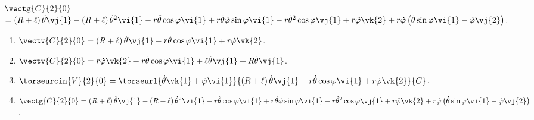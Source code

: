 $\vectg{C}{2}{0}$ 
$ =\left(R+\ell\right)\ddot{\theta}\vj{1} -\left(R+\ell\right)\dot{\theta}^2\vi{1} 
-r\ddot{\theta}\cos\varphi \vi{1} +r\dot{\theta}\dot{\varphi}\sin\varphi \vi{1} -r\dot{\theta}^2\cos\varphi \vj{1} 
+ r\ddot{\varphi}\vk{2}+ r\dot{\varphi}\left(\dot{\theta}\sin\varphi\vi{1}- \dot{\varphi}\vj{2} \right)$.
\else
\fi

\ifcolle
\else
\begin{solution}
\begin{enumerate}
\item $\vectv{C}{2}{0}= \left(R+\ell\right)\dot{\theta}\vj{1} -r\dot{\theta}\cos\varphi \vi{1} + r\dot{\varphi}\vk{2}$.
\item  $\vectv{C}{2}{0}=r\dot{\varphi}\vk{2}-r\dot{\theta}\cos\varphi\vi{1}+\ell\dot{\theta}\vj{1}+R\dot{\theta}\vj{1}$.
\item $\torseurcin{V}{2}{0} = \torseurl{\dot{\theta}\vk{1}+ \dot{\varphi}\vi{1}}{\left(R+\ell\right)\dot{\theta}\vj{1} -r\dot{\theta}\cos\varphi \vi{1} + r\dot{\varphi}\vk{2}}{C}$.
\item $\vectg{C}{2}{0} =\left(R+\ell\right)\ddot{\theta}\vj{1} -\left(R+\ell\right)\dot{\theta}^2\vi{1} 
-r\ddot{\theta}\cos\varphi \vi{1} +r\dot{\theta}\dot{\varphi}\sin\varphi \vi{1} -r\dot{\theta}^2\cos\varphi \vj{1} 
+ r\ddot{\varphi}\vk{2}+ r\dot{\varphi}\left(\dot{\theta}\sin\varphi\vi{1}- \dot{\varphi}\vj{2} \right)$.
\end{enumerate} 
\end{solution}%
\fi

